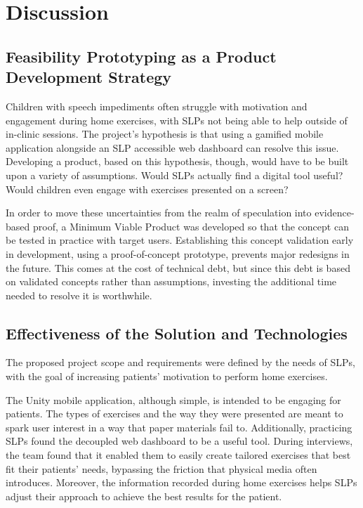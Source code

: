 \chapter{Discussion}
\label{ch:discussion}

\section{Feasibility Prototyping as a Product Development Strategy}
\label{sec:feasibility-prototyping-as-a-product-development-strategy}

Children with speech impediments often struggle with motivation and engagement during home exercises, with SLPs not being able to help outside of in-clinic sessions. The project's hypothesis is that using a gamified mobile application alongside an SLP accessible web dashboard can resolve this issue. Developing a product, based on this hypothesis, though, would have to be built upon a variety of assumptions. Would SLPs actually find a digital tool useful? Would children even engage with exercises presented on a screen? 

In order to move these uncertainties from the realm of speculation into evidence-based proof, a Minimum Viable Product was developed so that the concept can be tested in practice with target users. Establishing this concept validation early in development, using a proof-of-concept prototype, prevents major redesigns in the future. This comes at the cost of technical debt, but since this debt is based on validated concepts rather than assumptions, investing the additional time needed to resolve it is worthwhile. 

\section{Effectiveness of the Solution and Technologies}
\label{sec:effectiveness-of-the-solution-and-technologies}

The proposed project scope and requirements were defined by the needs of SLPs, with the goal of increasing patients' motivation to perform home exercises.

The Unity mobile application, although simple, is intended to be engaging for patients. The types of exercises and the way they were presented are meant to spark user interest in a way that paper materials fail to. Additionally, practicing SLPs found the decoupled web dashboard to be a useful tool. During interviews, the team found that it enabled them to easily create tailored exercises that best fit their patients' needs, bypassing the friction that physical media often introduces. Moreover, the information recorded during home exercises helps SLPs adjust their approach to achieve the best results for the patient.

